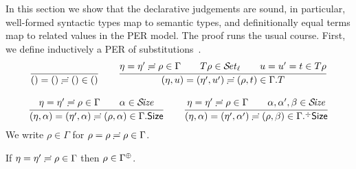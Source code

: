 \documentclass[acmsmall,screen]{acmart}\settopmatter{}
\begin{document}
In this section we show that the declarative judgements are sound, in
particular, well-formed syntactic types map to semantic types, and
definitionally equal terms map to related values in the PER model.
The proof runs the usual course.  First, we define inductively a
PER of substitutions
\,.
\begin{gather*}
  \ru{
    }{\sempty = \sempty \eeq \sempty \in \cempty}
\qquad
  \ru{\eta = \eta' \eeq \rho \in \Gamma \qquad
      T\rho \in \SET[\ell] \qquad
      u = u' = t \in T \rho
    }{\sext \eta u = \sext{\eta'}{u'} \eeq \sext{\rho}{t} \in \cext \Gamma T}
\\[2ex]
  \ru{\eta = \eta' \eeq \rho \in \Gamma \qquad \alpha \in \SIZE
    }{\sext \eta \alpha = \sext{\eta'}{\alpha} \eeq \sext{\rho}{\alpha} \in \cext \Gamma \Size}
\qquad
  \ru{\eta = \eta' \eeq \rho \in \Gamma \qquad \alpha,\alpha',\beta \in \SIZE
    }{\sext \eta \alpha = \sext{\eta'}{\alpha'} \eeq \sext{\rho}{\beta} \in \erext \Gamma \Size}
\end{gather*}
We write $\rho \in \Gamma$ for $\rho = \rho \risingdotseq \rho \in \Gamma$.
\begin{lemma}[Resurrection]
  \label{lem:resenv}
  If\/ $\eta = \eta' \risingdotseq \rho \in \Gamma$ then $\rho \in \resurrect\Gamma$.
\end{lemma}
\end{document}
